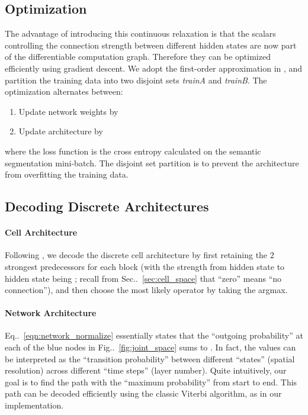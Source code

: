 \documentclass[10pt,twocolumn,letterpaper]{article}
\makeatletter
\def\@onedot{\ifx\@let@token.\else.\null\fi\xspace}
\DeclareRobustCommand\onedot{\futurelet\@let@token\@onedot}
\newcommand{\figref}[1]{Fig\onedot~\ref{#1}}
\newcommand{\equref}[1]{Eq\onedot~\eqref{#1}}
\newcommand{\secref}[1]{Sec\onedot~\ref{#1}}
\makeatother
\begin{document}
\subsection{Optimization}
\label{sec:optimization}

The advantage of introducing this continuous relaxation is that the scalars controlling the connection strength between different hidden states are now part of the differentiable computation graph.
Therefore they can be optimized efficiently using gradient descent.
We adopt the first-order approximation in \cite{liu2018darts}, and partition the training data into two disjoint sets \textit{trainA} and \textit{trainB}.
The optimization alternates between:
\begin{enumerate}
    \item Update network weights  by 
    \item Update architecture  by 
\end{enumerate}
where the loss function  is the cross entropy calculated on the semantic segmentation mini-batch.
The disjoint set partition is to prevent the architecture from overfitting the training data. 

\subsection{Decoding Discrete Architectures}
\label{sec:decode}

\paragraph{Cell Architecture}

Following \cite{liu2018darts}, we decode the discrete cell architecture by first retaining the 2 strongest predecessors for each block (with the strength from hidden state  to hidden state  being ; recall from \secref{sec:cell_space} that ``zero'' means ``no connection''), and then choose the most likely operator by taking the argmax.

\vspace{-\baselineskip}
\paragraph{Network Architecture}

\equref{eqn:network_normalize} essentially states that the ``outgoing probability'' at each of the blue nodes in \figref{fig:joint_space} sums to . 
In fact, the  values can be interpreted as the ``transition probability'' between different ``states'' (spatial resolution) across different ``time steps'' (layer number).
Quite intuitively, our goal is to find the path with the ``maximum probability'' from start to end.
This path can be decoded efficiently using the classic Viterbi algorithm, as in our implementation.
\end{document}
